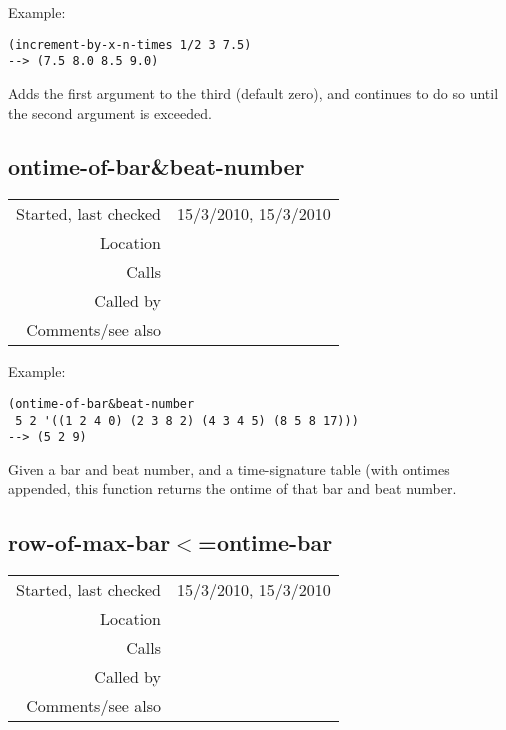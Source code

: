 \vspace{0.5cm}
\noindent Example:
\begin{verbatim}
(increment-by-x-n-times 1/2 3 7.5)
--> (7.5 8.0 8.5 9.0)
\end{verbatim}

\noindent Adds the first argument to the third
(default zero), and continues to do so until the
second argument is exceeded.


\subsection*{ontime-of-bar\&beat-number}\label{fun:ontime-of-bar-n-beat-number}

\vspace{0.3cm}
\begin{tabular}{r|p{8cm}}
Started, last checked & 15/3/2010, 15/3/2010 \\
Location & \nameref{sec:ontimes-signatures} \\
Calls & \nameref{fun:my-last} \\
Called by & \nameref{fun:bar-beat-ontimes} \\
Comments/see also & 
\end{tabular}

\vspace{0.5cm}
\noindent Example:
\begin{verbatim}
(ontime-of-bar&beat-number
 5 2 '((1 2 4 0) (2 3 8 2) (4 3 4 5) (8 5 8 17)))
--> (5 2 9)
\end{verbatim}

\noindent Given a bar and beat number, and a
time-signature table (with ontimes appended, this
function returns the ontime of that bar and beat
number.


\subsection*{row-of-max-bar$<$=ontime-bar}\label{fun:row-of-max-bar<=ontime-bar}

\vspace{0.3cm}
\begin{tabular}{r|p{8cm}}
Started, last checked & 15/3/2010, 15/3/2010 \\
Location & \nameref{sec:ontimes-signatures} \\
Calls & \\
Called by & \nameref{fun:ontime-of-bar-n-beat-number} \\
Comments/see also & 
\end{tabular}

